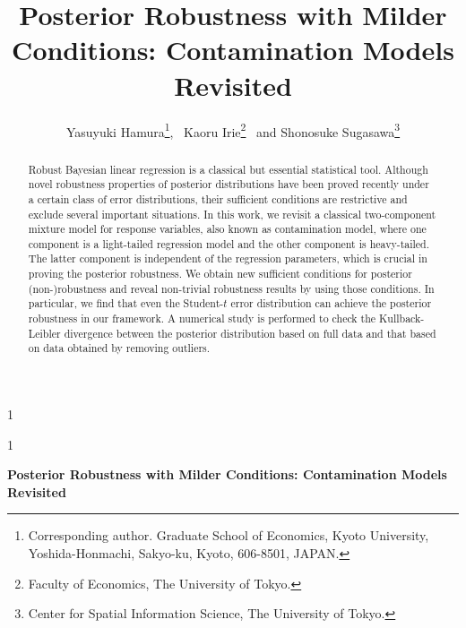 \documentclass[12pt]{article}
\newcommand{\blind}{1}
\begin{document}
%

\def\spacingset#1{\renewcommand{\baselinestretch}%
{#1}\small\normalsize} \spacingset{1}



\blind
{
  \title{\bf Posterior Robustness with Milder Conditions: Contamination Models Revisited}
  \author{
Yasuyuki Hamura\footnote{Corresponding author. 
Graduate School of Economics, Kyoto University, Yoshida-Honmachi, Sakyo-ku, Kyoto, 606-8501, JAPAN. 
}, \
Kaoru Irie\footnote{Faculty of Economics, The University of Tokyo. 
} \
and 
Shonosuke Sugasawa\footnote{Center for Spatial Information Science, The University of Tokyo. 
\newline{
E-Mail: sugasawa@csis.u-tokyo.ac.jp}} 
}
  \maketitle
} \fi

\blind
{
  \bigskip
  \bigskip
  \bigskip
  \begin{center}
    {\LARGE\bf Posterior Robustness with Milder Conditions: Contamination Models Revisited}
\end{center}
  \medskip
} \fi






\bigskip
\begin{abstract}
Robust Bayesian linear regression is a classical but essential statistical tool. Although novel robustness properties of posterior distributions have been proved recently under a certain class of error distributions, their sufficient conditions are restrictive and exclude several important situations. 
In this work, we revisit a classical two-component mixture model for response variables, also known as contamination model, where one component is a light-tailed regression model and the other component is heavy-tailed. The latter component is independent of the regression parameters, which is crucial in proving the posterior robustness. 
We obtain new sufficient conditions for posterior (non-)robustness and reveal non-trivial robustness results by using those conditions. In particular, we find that even the Student-$t$ error distribution can achieve the posterior robustness in our framework. %
A numerical study is performed to check the Kullback-Leibler divergence between the posterior distribution based on full data and that based on data obtained by removing outliers. 
\end{abstract}
\end{document}
